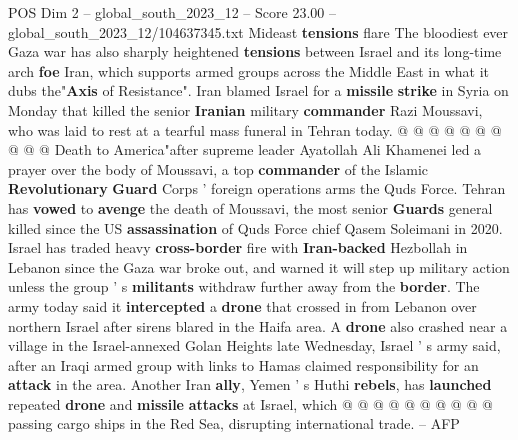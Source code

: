 \begin{textsample}{POS Dim 2 – global\_south\_2023\_12 – Score 23.00 – global\_south\_2023\_12/104637345.txt}
Mideast \textbf{tensions} flare The bloodiest ever Gaza war has also sharply heightened \textbf{tensions} between Israel and its long-time arch \textbf{foe} Iran, which supports armed groups across the Middle East in what it dubs the"\textbf{Axis} of Resistance".
Iran blamed Israel for a \textbf{missile} \textbf{strike} in Syria on Monday that killed the senior \textbf{Iranian} military \textbf{commander} Razi Moussavi, who was laid to rest at a tearful mass funeral in Tehran today. @ @ @ @ @ @ @ @ @ @ Death to America"after supreme leader Ayatollah Ali Khamenei led a prayer over the body of Moussavi, a top \textbf{commander} of the Islamic \textbf{Revolutionary} \textbf{Guard} Corps ' foreign operations arms the Quds Force.
Tehran has \textbf{vowed} to \textbf{avenge} the death of Moussavi, the most senior \textbf{Guards} general killed since the US \textbf{assassination} of Quds Force chief Qasem Soleimani in 2020.
Israel has traded heavy \textbf{cross-border} fire with \textbf{Iran-backed} Hezbollah in Lebanon since the Gaza war broke out, and warned it will step up military action unless the group ' s \textbf{militants} withdraw further away from the \textbf{border}.
The army today said it \textbf{intercepted} a \textbf{drone} that crossed in from Lebanon over northern Israel after sirens blared in the Haifa area.
A \textbf{drone} also crashed near a village in the Israel-annexed Golan Heights late Wednesday, Israel ' s army said, after an Iraqi armed group with links to Hamas claimed responsibility for an \textbf{attack} in the area.
Another Iran \textbf{ally}, Yemen ' s Huthi \textbf{rebels}, has \textbf{launched} repeated \textbf{drone} and \textbf{missile} \textbf{attacks} at Israel, which @ @ @ @ @ @ @ @ @ @ passing cargo ships in the Red Sea, disrupting international trade. -- AFP

\end{textsample}
